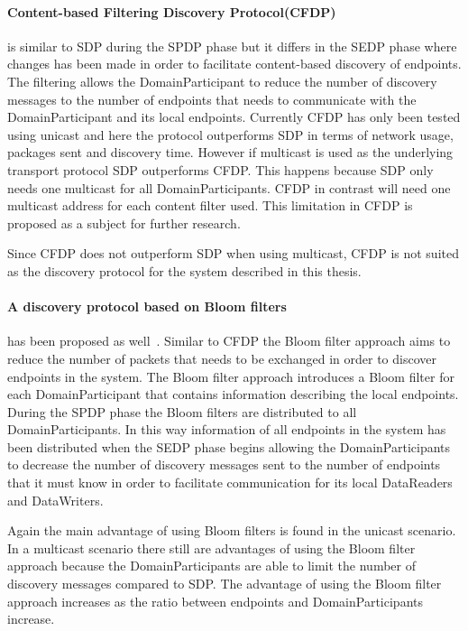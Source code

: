 \paragraph{Content-based Filtering Discovery Protocol(CFDP)} is similar to SDP during the SPDP phase but it differs in the SEDP phase where changes has been made in order to facilitate content-based discovery of endpoints. The filtering allows the DomainParticipant to reduce the number of discovery messages to the number of endpoints that needs to communicate with the DomainParticipant and its local endpoints. Currently CFDP has only been tested using unicast and here the protocol outperforms SDP in terms of network usage, packages sent and discovery time. However if multicast is used as the underlying transport protocol SDP outperforms CFDP. This happens because SDP only needs one multicast for all DomainParticipants. CFDP in contrast will need one multicast address for each content filter used. This limitation in CFDP is proposed as a subject for further research.

Since CFDP does not outperform SDP when using multicast, CFDP is not suited as the discovery protocol for the system described in this thesis.

\paragraph{A discovery protocol based on Bloom filters} has been proposed as well~\cite{monedero2009dds}. Similar to CFDP the Bloom filter approach aims to reduce the number of packets that needs to be exchanged in order to discover endpoints in the system. The Bloom filter approach introduces a Bloom filter for each DomainParticipant that contains information describing the local endpoints. During the SPDP phase the Bloom filters are distributed to all DomainParticipants. In this way information of all endpoints in the system has been distributed when the SEDP phase begins allowing the DomainParticipants to decrease the number of discovery messages sent to the number of endpoints that it must know in order to facilitate communication for its local DataReaders and DataWriters. 

Again the main advantage of using Bloom filters is found in the unicast scenario. In a multicast scenario there still are advantages of using the Bloom filter approach because the DomainParticipants are able to limit the number of discovery messages compared to SDP. The advantage of using the Bloom filter approach increases as the ratio between endpoints and DomainParticipants increase.

